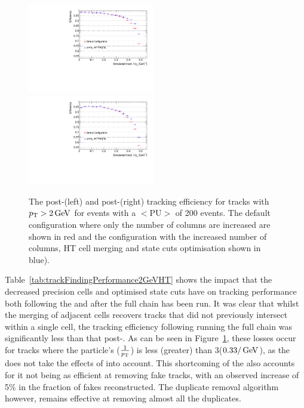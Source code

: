 \begin{figure}[htb]
\centering
\includegraphics[width=0.495\textwidth]{figs/tk-upgrade/results-lowPtTracking/htTrackingEffVsInvPtFlatGeometry_5000.pdf}
\includegraphics[width=0.495\textwidth]{figs/tk-upgrade/results-lowPtTracking/kfTrackingEffVsInvPtFlatGeometry_5000.pdf}
\caption{The post-\HT (left) and post-\KF (right) tracking efficiency for tracks with $p_{\mathrm{T}} > 2\,\text{Ge\hspace{-.08em}V}$ for \ttbar events with a $<\textrm{PU}>$ of 200 events. The default configuration where only the number of \qpt columns are increased are shown in red and the configuration with the increased number of columns, HT cell merging and \KF state cuts optimisation shown in blue).
}
\label{fig:2GeVFlatEff}	
\end{figure}

Table~\ref{tab:trackFindingPerformance2GeVHT} shows the impact that the decreased precision \HT cells and optimised \KF state cuts have on tracking performance both following the \HT and after the full chain has been run.
It was clear that whilst the merging of adjacent \HT cells recovers tracks that did not previously intersect within a single \HT cell, the tracking efficiency following running the full chain was significantly less than that post-\HT.
As can be seen in Figure~\ref{fig:2GeVFlatEff}, these losses occur for tracks where the particle's \pT ($\frac{1}{p_{\mathrm{T}}}$) is less (greater) than 3\GeV ($0.33/\,\text{Ge\hspace{-.08em}V}$), as the \KF does not take the effects of \MS into account.
This shortcoming of the \KF also accounts for it not being as efficient at removing fake tracks, with an observed increase of 5\% in the fraction of fakes reconstructed.
The duplicate removal algorithm however, remains effective at removing almost all the duplicates.

